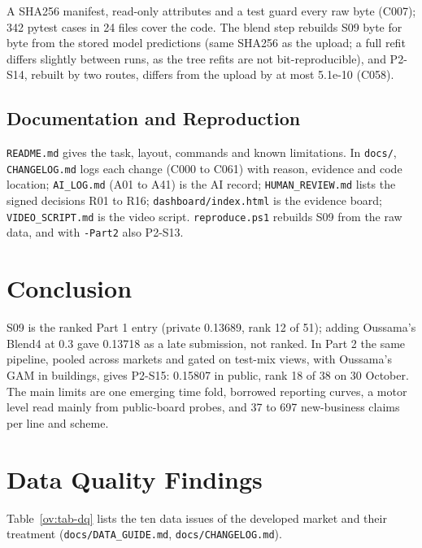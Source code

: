 A SHA256 manifest, read-only attributes and a test guard every raw byte (C007); 342 pytest cases in 24 files
cover the code. The blend step rebuilds S09 byte for byte from the stored model predictions (same SHA256 as the upload; a
full refit differs slightly between runs, as the tree refits are not bit-reproducible), and P2-S14, rebuilt by two
routes, differs from the upload by at most 5.1e-10 (C058).

\subsection{Documentation and Reproduction}

\texttt{README.md} gives the task, layout, commands and known limitations. In \texttt{docs/},
\texttt{CHANGELOG.md} logs each change (C000 to C061) with reason, evidence and code location;
\texttt{AI\_LOG.md} (A01 to A41) is the AI record; \texttt{HUMAN\_REVIEW.md} lists the signed decisions R01 to R16;
\texttt{dashboard/index.html} is the evidence board; \texttt{VIDEO\_SCRIPT.md} is the video script. \texttt{reproduce.ps1} rebuilds S09 from the raw data, and with \texttt{-Part2} also P2-S13.


\section{Conclusion}

S09 is the ranked Part 1 entry (private 0.13689, rank 12 of 51); adding Oussama's Blend4 at 0.3 gave 0.13718 as a late
submission, not ranked. In Part 2 the same pipeline, pooled across markets and gated on test-mix views, with Oussama's
GAM in buildings, gives P2-S15: 0.15807 in public, rank 18 of 38 on 30 October. The main limits are one emerging time
fold, borrowed reporting curves, a motor level read mainly from public-board probes, and 37 to 697 new-business claims
per line and scheme.


\clearpage
\appendix

\section{Data Quality Findings}
\label{ov:app-dq}

Table~\ref{ov:tab-dq} lists the ten data issues of the developed market and their treatment
(\texttt{docs/DATA\_GUIDE.md}, \texttt{docs/CHANGELOG.md}).

